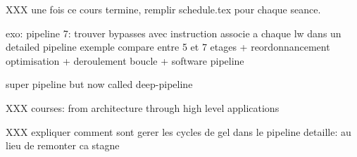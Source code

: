 XXX une fois ce cours termine, remplir schedule.tex pour chaque seance.

exo: pipeline 7: trouver bypasses avec instruction associe a chaque
     lw dans un detailed pipeline
exemple compare entre 5 et 7 etages + reordonnancement optimisation
+ deroulement boucle + software pipeline

super pipeline but now called deep-pipeline

XXX courses: from architecture through high level applications

XXX expliquer comment sont gerer les cycles de gel dans le pipeline
detaille: au lieu de remonter ca stagne
